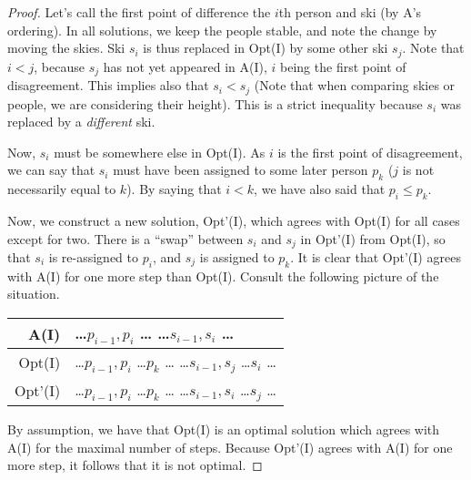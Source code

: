 \documentclass{article}
\begin{document}
\begin{enumerate}[label=(\alph*)]
\begin{proof}
            Let's call the first point of difference the $i$th person and ski (by A's ordering).
            In all solutions, we keep the people stable, and note the change by moving the skies.
            Ski $s_i$ is thus replaced in Opt(I) by some other ski $s_j$.
            Note that $i < j$, because $s_j$ has not yet appeared in A(I), $i$ being the first point of disagreement.
            This implies also that $s_i < s_j$ (Note that when comparing skies or people, we are considering their height).
            This is a strict inequality because $s_i$ was replaced by a \emph{different} ski.
            
            Now, $s_i$ must be somewhere else in Opt(I).
            As $i$ is the first point of disagreement, we can say that $s_i$ must have been assigned to some later person $p_k$ ($j$ is not necessarily equal to $k$).
            By saying that $i < k$, we have also said that $p_i \leq p_k$.

            Now, we construct a new solution, Opt'(I), which agrees with Opt(I) for all cases except for two.
            There is a ``swap'' between $s_i$ and $s_j$ in Opt'(I) from Opt(I), so that $s_i$ is re-assigned to $p_i$, and $s_j$ is assigned to $p_k$.
            It is clear that Opt'(I) agrees with A(I) for one more step than Opt(I).
            Consult the following picture of the situation.
            
            \begin{center}
            \begin{tabular}{r | p{}}
                A(I) & \ldots $p_{i-1}, p_i$ \ldots \newline
                    \ldots $s_{i-1}, s_i$ \ldots\\
                \hline
                Opt(I) & \ldots $p_{i-1}, p_i$ \ldots $p_k$ \ldots \newline
                \ldots $s_{i-1}, s_j$ \ldots $s_i$ \ldots \\
                \hline
                Opt'(I) & \ldots $p_{i-1}, p_i$ \ldots $p_k$ \ldots \newline
                \ldots $s_{i-1}, s_i$ \ldots $s_j$ \ldots \\
            \end{tabular}
            \end{center}
            
            By assumption, we have that Opt(I) is an optimal solution which agrees with A(I) for the maximal number of steps.
            Because Opt'(I) agrees with A(I) for one more step, it follows that it is not optimal.
            

\end{proof}
\end{enumerate}
\end{document}
